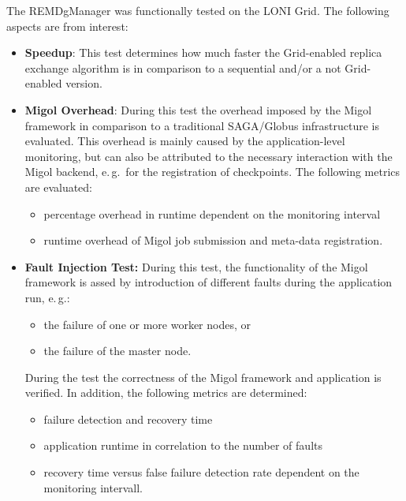 \documentclass[times, 10pt,twocolumn]{article}
\begin{document}



The REMDgManager was functionally tested on the LONI Grid. The following aspects are from interest:
\begin{itemize}
    \item \textbf{Speedup}: This test determines how much faster the Grid-enabled replica exchange algorithm is in comparison  to a sequential and/or a not Grid-enabled version.
    
    \item \textbf{Migol Overhead}:  During this test the overhead imposed by the Migol framework in comparison to a traditional SAGA/Globus infrastructure is evaluated. This overhead is mainly caused by the application-level monitoring, but can also be attributed to the necessary interaction with the Migol backend, e.\,g.\ for the registration of checkpoints. The following  metrics are evaluated:
    \begin{itemize}
        \item percentage overhead in runtime dependent on the monitoring interval
        \item runtime overhead of Migol job submission and meta-data registration. 
    \end{itemize}                                                           
    
    \item \textbf{Fault Injection Test:}  During this test, the functionality of the Migol framework is assed by introduction of different faults during the application run, e.\,g.:
    \begin{itemize}
        \item the failure of one or more worker nodes, or
        \item the failure of the master node.        
    \end{itemize}                       
    During the test the correctness of the Migol framework and application is verified. In addition, the following metrics are determined:
    \begin{itemize}
        \item failure detection and recovery time
        \item application runtime in correlation to the number of faults
        \item recovery time versus false failure detection rate dependent on the monitoring intervall.
    \end{itemize}
                                                                                 

\end{itemize}
\end{document}
